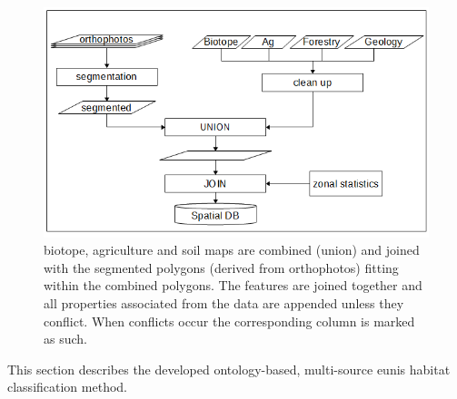 \documentclass[authoryear,preprint,12pt,number]{elsarticle}
\begin{document}
\begin{figure} \includegraphics[width=1\textwidth]{diagrams/pre_processing.png}
    \caption{biotope, agriculture and soil maps are combined 
    (union) and joined with the segmented polygons (derived from 
    orthophotos) fitting within the combined polygons. The features are joined 
    together and all properties associated from the data are appended unless 
    they conflict. When conflicts occur the corresponding column is marked as 
    such.\label{fig:pre-processing}}
\end{figure}

This section describes the developed ontology-based, multi-source \gls{eunis} 
habitat classification method.
\label{subsec:method_overview}
\end{document}
